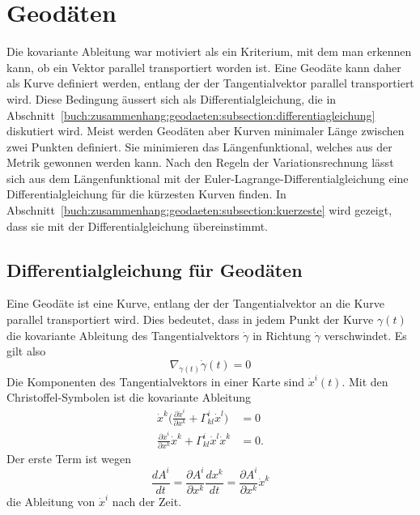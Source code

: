 %
%
%

%
%
\section{Geodäten
\label{buch:zusammenhang:section:geodaeten}}
Die kovariante Ableitung war motiviert als ein Kriterium, mit
dem man erkennen kann, ob ein Vektor parallel transportiert
worden ist.
Eine Geodäte kann daher als Kurve definiert werden, entlang der
der Tangentialvektor parallel transportiert wird.
Diese Bedingung äussert sich als Differentialgleichung, die in
Abschnitt~\ref{buch:zusammenhang:geodaeten:subsection:differentiagleichung}
diskutiert wird.
Meist werden Geodäten aber Kurven minimaler Länge zwischen zwei Punkten
definiert.
Sie minimieren das Längenfunktional, welches aus der Metrik gewonnen
werden kann.
Nach den Regeln der Variationsrechnung lässt sich aus dem Längenfunktional
mit der Euler-Lagrange-Differentialgleichung eine Differentialgleichung
für die kürzesten Kurven finden.
In Abschnitt~\ref{buch:zusammenhang:geodaeten:subsection:kuerzeste}
wird gezeigt, dass sie mit der Differentialgleichung übereinstimmt.

%
%
\subsection{Differentialgleichung für Geodäten
\label{buch:zusammenhang:geodaeten:subsection:differentialgleichung}}
Eine Geodäte ist eine Kurve, entlang der der Tangentialvektor an die
Kurve parallel transportiert wird.
Dies bedeutet, dass in jedem Punkt der Kurve $\gamma(t)$ die kovariante
Ableitung des Tangentialvektors $\dot{\gamma}$ in Richtung
$\dot{\gamma}$ verschwindet.
Es gilt also
\[
\nabla_{\dot{\gamma}(t)} \dot{\gamma}(t)
=
0
\]
Die Komponenten des Tangentialvektors in einer Karte sind $\dot{x}^i(t)$.
Mit den Christoffel-Symbolen ist die kovariante Ableitung
\begin{align*}
\dot{x}^k
\biggl(
\frac{\partial\dot{x}^i}{\partial x^k}
+
\Gamma^i_{kl}\dot{x}^l
\biggr)
&=
0
\\
\frac{\partial\dot{x}^i}{\partial x^k}
\dot{x}^k
+
\Gamma^i_{kl} \dot{x}^l \dot{x}^k
&=
0.
\end{align*}
Der erste Term ist wegen
\[
\frac{dA^i}{dt}
=
\frac{\partial A^i}{\partial x^k}\frac{dx^k}{dt}
=
\frac{\partial A^i}{\partial x^k}
\dot{x}^k
\]
die Ableitung von $\dot{x}^i$ nach der Zeit.

